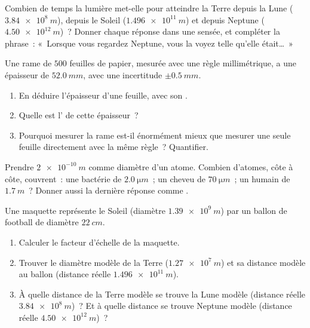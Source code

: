 \begin{exercise}[$\star\star$]\label{exo:g10:orders-of-magnitude:7}
Combien de temps la lumière met-elle pour atteindre la Terre depuis la
Lune ($\qty{3.84e8}{m}$), depuis le Soleil ($\qty{1.496e11}{m}$) et
depuis Neptune ($\qty{4.50e12}{m}$)~? Donner chaque réponse dans une
 sensée, et compléter la phrase~: «~Lorsque vous regardez
Neptune, vous la voyez telle qu'elle était\dots~»
\end{exercise}

\begin{exercise}[$\star\star$]\label{exo:g10:orders-of-magnitude:8}
Une rame de $500$ feuilles de papier, mesurée avec une règle
millimétrique, a une épaisseur de $\qty{52.0}{mm}$, avec une
incertitude $\pm\qty{0.5}{mm}$.
\begin{enumerate}
  \item En déduire l'épaisseur d'une feuille, avec son .
  \item Quelle est l' de cette épaisseur~?
  \item Pourquoi mesurer la rame est-il énormément mieux que mesurer
        une seule feuille directement avec la même règle~? Quantifier.
\end{enumerate}
\end{exercise}

\begin{exercise}[$\star\star$]\label{exo:g10:orders-of-magnitude:9}
Prendre $\qty{2e-10}{m}$ comme diamètre d'un atome. Combien d'atomes,
côte à côte, couvrent~: une bactérie de $\qty{2.0}{\micro m}$~; un
cheveu de $\qty{70}{\micro m}$~; un humain de $\qty{1.7}{m}$~? Donner
aussi la dernière réponse comme .
\end{exercise}

\begin{exercise}[$\star\star$]\label{exo:g10:orders-of-magnitude:10}
Une maquette représente le Soleil (diamètre $\qty{1.39e9}{m}$) par un
ballon de football de diamètre $\qty{22}{cm}$.
\begin{enumerate}
  \item Calculer le facteur d'échelle de la maquette.
  \item Trouver le diamètre modèle de la Terre ($\qty{1.27e7}{m}$) et
        sa distance modèle au ballon (distance réelle
        $\qty{1.496e11}{m}$).
  \item À quelle distance de la Terre modèle se trouve la Lune modèle
        (distance réelle $\qty{3.84e8}{m}$)~? Et à quelle distance se
        trouve Neptune modèle (distance réelle $\qty{4.50e12}{m}$)~?
\end{enumerate}
\end{exercise}

